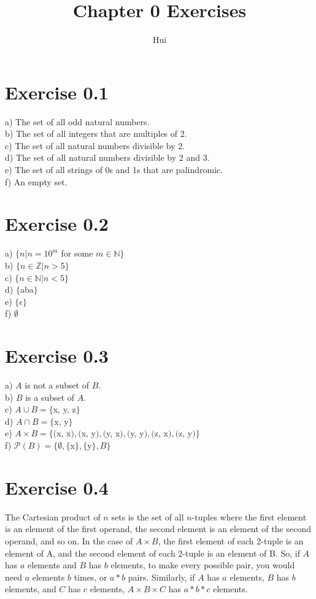 \documentclass{article}
\begin{document}
\title{Chapter 0 Exercises}
\author{Hui}
\date{}
\maketitle

\section{Exercise 0.1}
a) The set of all odd natural numbers.
\\b) The set of all integers that are multiples of 2.
\\c) The set of all natural numbers divisible by 2.
\\d) The set of all natural numbers divisible by 2 and 3.
\\e) The set of all strings of 0s and 1s that are palindromic.
\\f) An empty set.
\section{Exercise 0.2}
a) $\{ n | n = 10^m$ for some $m\in \mathbb N\}$
\\b) $\{ n\in \mathbb Z | n > 5\}$
\\c) $\{ n\in \mathbb N | n < 5\}$
\\d) $\{$aba$\}$
\\e) $\{\epsilon\}$
\\f) $\emptyset$
\section{Exercise 0.3}
a) $A$ is not a subset of $B$.
\\b) $B$ is a subset of $A$.
\\c) $A \cup B = \{$x, y, z$\}$
\\d) $A \cap B = \{$x, y$\}$
\\e) $A \times B = \{($x, x$), ($x, y$), ($y, x$), ($y, y$), ($z, x$), ($z, y$)\}$
\\f) $\mathcal{P}(B) = \{\emptyset, \{$x$\}, \{$y$\}, B\}$
\section{Exercise 0.4}
The Cartesian product of $n$ sets is the set of all $n$-tuples where the first element is an element of the first operand, the second element is an element of the second operand, and so on. In the case of $A \times B$, the first element of each 2-tuple is an element of A, and the second element of each 2-tuple is an element of B. So, if $A$ has $a$ elements and $B$ has $b$ elements, to make every possible pair, you would need $a$ elements $b$ times, or $a * b$ pairs. Similarly, if $A$ has $a$ elements, $B$ has $b$ elements, and $C$ has $c$ elements, $A \times B \times C$ has $a * b * c$ elements.
\end{document}
